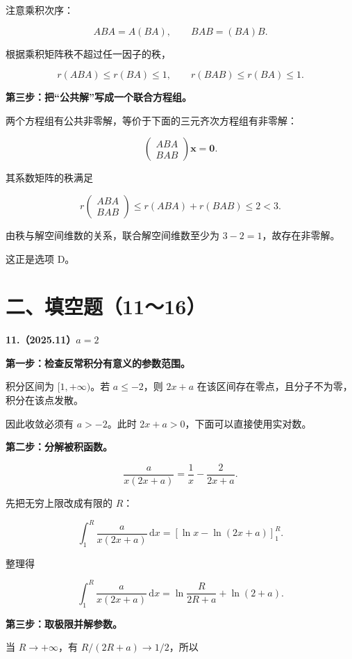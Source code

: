 \documentclass[UTF8,11pt,fontset=windows]{ctexart}
\begin{document}
注意乘积次序：

$$
ABA=A(BA),\qquad BAB=(BA)B.
$$

根据乘积矩阵秩不超过任一因子的秩，

$$
r(ABA)\le r(BA)\le1,
\qquad r(BAB)\le r(BA)\le1.
$$

\textbf{第三步：把“公共解”写成一个联合方程组。}

两个方程组有公共非零解，等价于下面的三元齐次方程组有非零解：

$$
\begin{pmatrix}ABA\\BAB\end{pmatrix}\boldsymbol x=\boldsymbol0.
$$

其系数矩阵的秩满足

$$
r\begin{pmatrix}ABA\\BAB\end{pmatrix}
\le r(ABA)+r(BAB)\le2<3.
$$

由秩与解空间维数的关系，联合解空间维数至少为 $3-2=1$，故存在非零解。

这正是选项 D。

\clearpage

\section*{二、填空题（11～16）}

\textbf{11.（2025.11）$a=2$}

\textbf{第一步：检查反常积分有意义的参数范围。}

积分区间为 $[1,+\infty)$。若 $a\le-2$，则 $2x+a$ 在该区间存在零点，且分子不为零，积分在该点发散。

因此收敛必须有 $a>-2$。此时 $2x+a>0$，下面可以直接使用实对数。

\textbf{第二步：分解被积函数。}

$$
\frac{a}{x(2x+a)}=\frac1x-\frac2{2x+a}.
$$

先把无穷上限改成有限的 $R$：

$$
\int_1^R\frac{a}{x(2x+a)}\,\mathrm dx
=\left[\ln x-\ln(2x+a)\right]_1^R.
$$

整理得

$$
\int_1^R\frac{a}{x(2x+a)}\,\mathrm dx
=\ln\frac{R}{2R+a}+\ln(2+a).
$$

\textbf{第三步：取极限并解参数。}

当 $R\to+\infty$，有 $R/(2R+a)\to1/2$，所以
\end{document}
